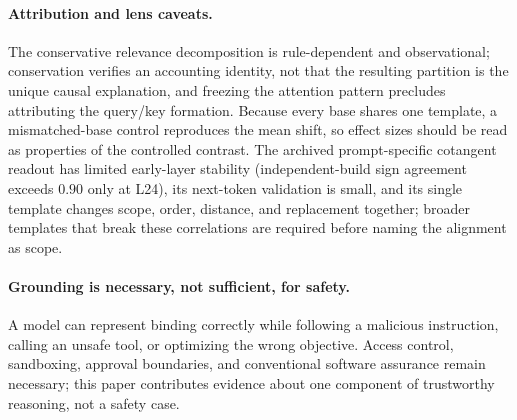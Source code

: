 \documentclass[10pt]{article}
\begin{document}
\paragraph{Attribution and lens caveats.} The conservative relevance decomposition is rule-dependent and
observational; conservation verifies an accounting identity, not that the
resulting partition is the unique causal explanation, and freezing the attention
pattern precludes attributing the query/key formation. Because every base shares
one template, a mismatched-base control reproduces the mean shift, so effect sizes
should be read as properties of the controlled contrast. The archived prompt-specific cotangent readout has limited
early-layer stability (independent-build sign agreement exceeds $0.90$ only at
L24), its next-token validation is small, and its single template changes scope,
order, distance, and replacement together; broader templates that break these
correlations are required before naming the alignment as scope.

\paragraph{Grounding is necessary, not sufficient, for safety.} A model can
represent binding correctly while following a malicious instruction, calling an
unsafe tool, or optimizing the wrong objective. Access control, sandboxing,
approval boundaries, and conventional software assurance remain necessary; this
paper contributes evidence about one component of trustworthy reasoning, not a
safety case.



\clearpage
\appendix

\end{document}
